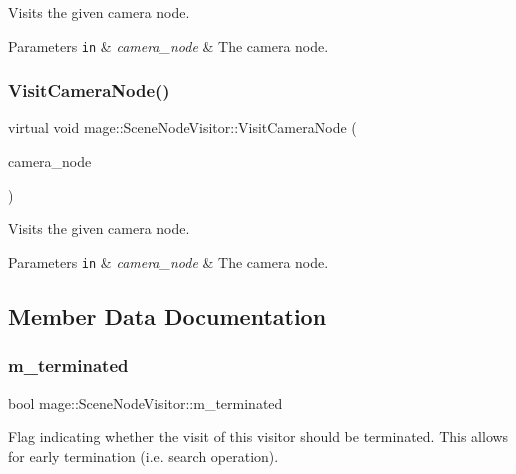 Visits the given camera node.


\begin{DoxyParams}[1]{Parameters}
\mbox{\tt in}  & {\em camera\+\_\+node} & The camera node. \\
\hline
\end{DoxyParams}
\hypertarget{classmage_1_1_scene_node_visitor_a4a3bb0c3ad6253c919259efabbccfab9}{}\label{classmage_1_1_scene_node_visitor_a4a3bb0c3ad6253c919259efabbccfab9} 
\subsubsection{\texorpdfstring{Visit\+Camera\+Node()}{VisitCameraNode()}\hspace{0.1cm}{\footnotesize\ttfamily [2/2]}}
{\footnotesize\ttfamily virtual void mage\+::\+Scene\+Node\+Visitor\+::\+Visit\+Camera\+Node (\begin{DoxyParamCaption}\item[{const \hyperlink{classmage_1_1_camera_node}{Camera\+Node} \&}]{camera\+\_\+node }\end{DoxyParamCaption})\hspace{0.3cm}{\ttfamily [virtual]}}

Visits the given camera node.


\begin{DoxyParams}[1]{Parameters}
\mbox{\tt in}  & {\em camera\+\_\+node} & The camera node. \\
\hline
\end{DoxyParams}


\subsection{Member Data Documentation}
\hypertarget{classmage_1_1_scene_node_visitor_a3f3b8db683cdb5b9c09c1426738ee73a}{}\label{classmage_1_1_scene_node_visitor_a3f3b8db683cdb5b9c09c1426738ee73a} 
\subsubsection{\texorpdfstring{m\+\_\+terminated}{m\_terminated}}
{\footnotesize\ttfamily bool mage\+::\+Scene\+Node\+Visitor\+::m\+\_\+terminated\hspace{0.3cm}{\ttfamily [private]}}

Flag indicating whether the visit of this visitor should be terminated. This allows for early termination (i.\+e. search operation). 